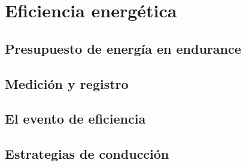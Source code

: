 \chapter{Eficiencia energética}
\label{ch:eficiencia_energetica}

\begin{objetivos}
  \item {}
  \item {}
  \item {}
\end{objetivos}


\section{Presupuesto de energía en endurance}
\label{sec:eficiencia_energetica:01}

\section{Medición y registro}
\label{sec:eficiencia_energetica:02}

\section{El evento de eficiencia}
\label{sec:eficiencia_energetica:03}

\section{Estrategias de conducción}
\label{sec:eficiencia_energetica:04}


\begin{caso}
\end{caso}

